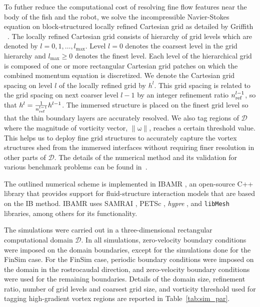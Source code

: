 \documentclass[onecolumn]{IEEEtran}
\renewcommand{\vec}[1]{\bm{\mathrm{#1}}}
\def \ell{l}
\def \cD{\mathcal{D}}
\def \ellmax{\ell_{\textrm{max}}}
\def \nref{n_{\textnormal{ref}}}
\def \hell{h^{\ell}}
\def \hellminus{h^{\ell-1}}
\def \normomega{\| \vec{\omega} \|}
\begin{document}
To futher reduce the computational cost 
of resolving fine flow features near the body of the fish and the robot, we solve the incompressible 
Navier-Stokes equation on block-structured locally refined Cartesian grid as detailed by Griffith
~\citep*{Grif09b,Grif12a,Grif05a,Grif05b,Grif07a,Grif09b}. The locally refined Cartesian 
grid consists of hierarchy of grid levels which are denoted by $\ell=0,1,\ldots,\ellmax$. 
Level $\ell = 0$ denotes the coarsest level in the grid hierarchy and  $\ellmax \ge 0$ denotes
the finest level.  Each level of the hierarchical grid is composed of
one or more rectangular Cartesian grid patches on which the combined
momentum equation is discretized.  We denote the Cartesian grid spacing on level $\ell$ of 
the locally refined grid by $\hell$. This grid spacing is related
to the grid spacing on next coarser level $\ell-1$ by an integer refinement 
ratio $\nref^{\ell-1}$, so that $\hell = \frac{1}{\nref^{\ell-1}} \hellminus$.  
The immersed structure is placed on the finest grid level so that the thin 
boundary layers are accurately resolved. We also tag regions of $\cD$ where 
the magnitude of vorticity vector, $\normomega$, reaches a certain threshold value. 
This helps us to deploy fine grid structures to accurately capture the vortex
structures shed from the immersed interfaces without requiring finer resolution
in other parts of $\cD$. The details of the numerical method 
and its validation for various benchmark problems can be found in~\citep*{Bhal13}.

The outlined numerical scheme is implemented in IBAMR \citep*{IBAMR-web-page},
an open-source C++ library that provides support for fluid-structure 
interaction models that are based on the IB method. IBAMR uses SAMRAI
\citep*{samrai-web-page,Horn02a,Horn06a}, PETSc
\citep*{petsc-web-page,petsc-user-ref,petsc-efficient}, \emph{hypre}
\citep*{hypre-web-page,Falg02a}, and \texttt{libMesh}
\citep*{libMesh-web-page,kirk06a} libraries, among others for its
functionality.      

The simulations were carried out in a three-dimensional rectangular computational domain $\mathcal{D}$. 
In all simulations, zero-velocity boundary conditions were imposed on the domain boundaries, except for the
simulations done for the FinSim case. For the FinSim case, periodic boundary conditions were imposed on the domain in 
the rostrocaudal direction, and zero-velocity boundary conditions were used for the remaining boundaries. Details of 
the domain size, refinement ratio, number of grid levels and coarsest grid size, and vorticity threshold used for 
tagging high-gradient vortex regions are reported in Table~\ref{tab:sim_par}.
\end{document}
